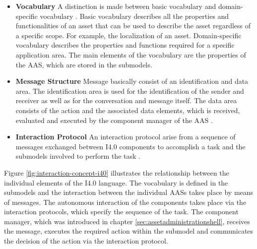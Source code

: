 \begin{itemize}
    \item [] \textbf{Vocabulary} A distinction is made between basic vocabulary and domain-specific vocabulary \cite[p. 12]{Bock2016Weiterentwicklung4.0-Komponenten}. Basic vocabulary describes all the properties and functionalities of an asset that can be used to describe the asset regardless of a specific scope. For example, the localization of an asset. Domain-specific vocabulary describes the properties and functions required for a specific application area. The main elements of the vocabulary are the properties of the \ac{AAS}, which are stored in the submodels.
    \item [] \textbf{Message Structure} Message basically consist of an identification and data area. The identification area is used for the identification of the sender and receiver as well as for the conversation and message itself. The data area consists of the action and the associated data elements, which is received, evaluated and executed by the component manager of the \ac{AAS} \cite[p. 17]{Bock2016Weiterentwicklung4.0-Komponenten}.
    \item [] \textbf{Interaction Protocol} An interaction protocol arise from a sequence of messages exchanged between \ac{I4.0} components to accomplish a task and the submodels involved to perform the task \cite[p. 13]{Bock2016Weiterentwicklung4.0-Komponenten}.
\end{itemize}

Figure \ref{fig:interaction-concept-i40} illustrates the relationship between the individual elements of the \ac{I4.0} language. The vocabulary is defined in the submodels and the interaction between the individual \ac{AAS}s takes place by means of messages. The autonomous interaction of the components takes place via the interaction protocols, which specify the sequence of the task. The component manager, which was introduced in chapter \ref{sec:assetadministrationshell}, receives the message, executes the required action within the submodel and communicates the decision of the action via the interaction protocol.

